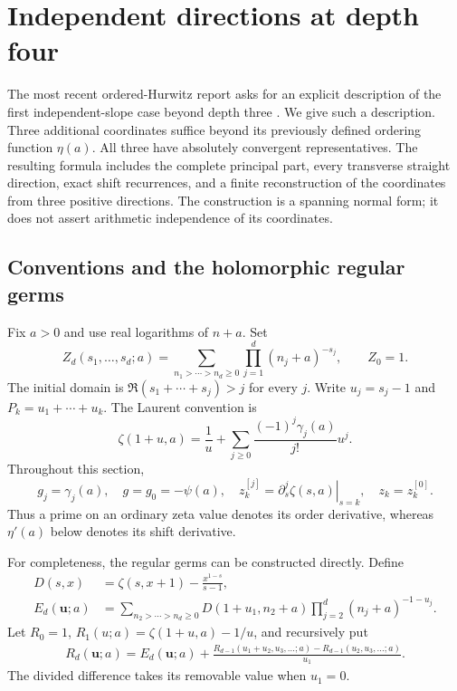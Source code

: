 \section{Independent directions at depth four}
\label{oq:section}

The most recent ordered-Hurwitz report asks for an explicit description of
the first independent-slope case beyond depth three
\cite[Questions 1--2]{RepoOrdered}. We give such a description. Three
additional coordinates suffice beyond its previously defined ordering
function $\eta(a)$. All three have absolutely convergent representatives.
The resulting formula includes the complete principal part, every
transverse straight direction, exact shift recurrences, and a finite
reconstruction of the coordinates from three positive directions.
The construction is a spanning normal form; it does not assert arithmetic
independence of its coordinates.

\subsection{Conventions and the holomorphic regular germs}

Fix $a>0$ and use real logarithms of $n+a$. Set
\[
 Z_d(s_1,\ldots,s_d;a)
 =\sum_{n_1>\cdots>n_d\ge0}\prod_{j=1}^d(n_j+a)^{-s_j},
 \qquad Z_0=1.
\]
The initial domain is $\Re(s_1+\cdots+s_j)>j$ for every $j$.
Write $u_j=s_j-1$ and $P_k=u_1+\cdots+u_k$.
The Laurent convention is
\begin{equation}\label{oq:stieltjes}
 \zeta(1+u,a)=\frac1u+
 \sum_{j\ge0}\frac{(-1)^j\gamma_j(a)}{j!}u^j.
\end{equation}
Throughout this section,
\[
 g_j=\gamma_j(a),\quad g=g_0=-\psi(a),\quad
 z_k^{[j]}=\left.\partial_s^j\zeta(s,a)\right|_{s=k},
 \quad z_k=z_k^{[0]}.
\]
Thus a prime on an ordinary zeta value denotes its order derivative,
whereas $\eta'(a)$ below denotes its shift derivative.

For completeness, the regular germs can be constructed directly.
Define
\begin{align}
 D(s,x)&=\zeta(s,x+1)-\frac{x^{1-s}}{s-1},\label{oq:D}\\
 E_d(\mathbf u;a)&=
 \sum_{n_2>\cdots>n_d\ge0}
 D(1+u_1,n_2+a)\prod_{j=2}^d(n_j+a)^{-1-u_j}.
 \label{oq:E}
\end{align}
Let $R_0=1$, $R_1(u;a)=\zeta(1+u,a)-1/u$, and recursively put
\begin{align}\label{oq:Rrec}
 R_d(\mathbf u;a)=E_d(\mathbf u;a)+
 \frac{R_{d-1}(u_1+u_2,u_3,\ldots;a)
       -R_{d-1}(u_2,u_3,\ldots;a)}{u_1}.
\end{align}
The divided difference takes its removable value when $u_1=0$.

